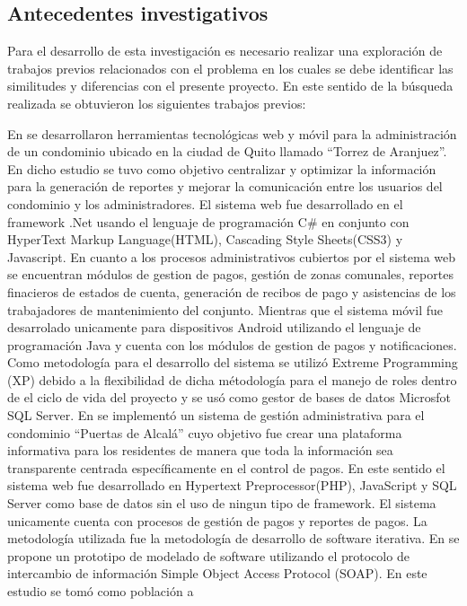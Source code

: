 \subsection{Antecedentes investigativos}
Para el desarrollo de esta investigación es necesario realizar una exploración de trabajos previos relacionados con el problema en los cuales se debe identificar las similitudes y diferencias con el presente proyecto. En este sentido de la búsqueda realizada se obtuvieron los siguientes trabajos previos:
\bigbreak

En\cite{ortegaAnalisisDisenoImplementacion2017} se desarrollaron herramientas tecnológicas web y móvil para la administración de un condominio ubicado en la ciudad de Quito llamado {\textquotedblleft}Torrez de Aranjuez{\textquotedblright}. En dicho estudio se tuvo como objetivo centralizar y optimizar la información para la generación de reportes y mejorar la comunicación entre los usuarios del condominio y los administradores. El sistema web fue desarrollado en el framework .Net usando el lenguaje de programación {C\#} en conjunto con HyperText Markup Language(HTML), Cascading Style Sheets(CSS3) y Javascript. En cuanto a los procesos administrativos cubiertos por el sistema web se encuentran módulos de gestion de pagos, gestión de zonas comunales, reportes finacieros de estados de cuenta, generación de recibos de pago y asistencias de los trabajadores de mantenimiento del conjunto. Mientras que el sistema móvil fue desarrolado unicamente para dispositivos Android utilizando el lenguaje de programación Java y cuenta con los módulos de gestion de pagos y notificaciones. Como metodología para el desarrollo del sistema se utilizó Extreme Programming (XP) debido a la flexibilidad de dicha métodología para el manejo de roles dentro de el ciclo de vida del proyecto y se usó como gestor de bases de datos Microsfot SQL Server.
\bigbreak
En\cite{pintoSistemaGestionAdministrativo2017} se implementó un sistema de gestión administrativa para el condominio {\textquotedblleft}Puertas de Alcalá{\textquotedblright} cuyo objetivo fue crear una plataforma informativa para los residentes de manera que toda la información sea transparente centrada específicamente en el control de pagos. En este sentido el sistema web fue desarrollado en Hypertext Preprocessor(PHP), JavaScript y SQL Server como base de datos sin el uso de ningun tipo de framework. El sistema unicamente cuenta con procesos de gestión de pagos y reportes de pagos. La metodología utilizada fue la metodología de desarrollo de software iterativa.
\bigbreak
En\cite{nietoPrototipoAplicacionWeb2018} se propone un prototipo de modelado de software utilizando el protocolo de intercambio de información Simple Object Access Protocol (SOAP). En este estudio se tomó como población a
